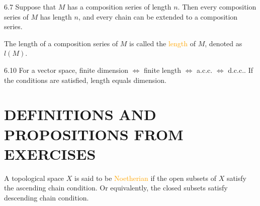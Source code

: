 \begin{proposition}{6.7}
	Suppose that $M$ has a composition series of length $n$. Then every composition series of $M$ has length $n$, and every chain can be extended to a composition series.
\end{proposition}

The length of a composition series of $M$ is called the \textcolor{orange}{length} of $M$, denoted as $l(M)$.

\begin{proposition}{6.10}
	For a vector space, finite dimension $\Leftrightarrow$ finite length $\Leftrightarrow$ a.c.c. $\Leftrightarrow$ d.c.c.. If the conditions are satisfied, length equals dimension.
\end{proposition}

\section*{DEFINITIONS AND PROPOSITIONS FROM EXERCISES}

A topological space $X$ is said to be \textcolor{orange}{Noetherian} if the open subsets of $X$ satisfy the ascending chain condition. Or equivalently, the closed subsets satisfy descending chain condition.
